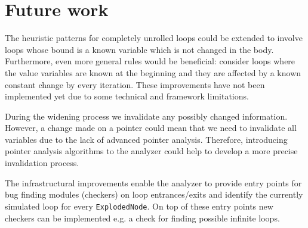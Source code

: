 
\section{Future work}
The heuristic patterns for completely unrolled loops could be extended to 
involve loops whose bound is a known variable which is not changed in the body. 
Furthermore, even more general rules would be beneficial: consider loops where  
the value variables are known at the beginning and they are affected by a known 
constant change by every iteration. These improvements have not been implemented
yet due to some technical and framework limitations.

During the widening process we invalidate any possibly changed information. 
However, a change made on a pointer could mean that we need to 
invalidate all variables due to the lack of advanced pointer analysis. Therefore, 
introducing pointer analysis algorithms to the analyzer could help to develop a 
more precise invalidation process.

The infrastructural improvements enable the analyzer to provide entry points 
for bug finding modules (checkers) on loop entrances/exits and identify the 
currently simulated loop for every \texttt{ExplodedNode}. On top of these entry 
points new checkers can be implemented e.g. a check for finding possible 
infinite loops.
